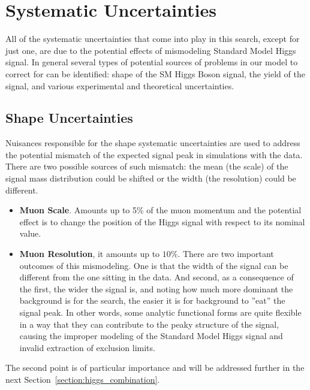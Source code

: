 \section{Systematic Uncertainties} \label{section:higgs_systematics}
All of the systematic uncertainties that come into play in this search, except for just one, are due to the potential effects of mismodeling Standard Model Higgs signal. In general several types of potential sources of problems in our model to correct for can be identified: shape of the SM Higgs Boson signal, the yield of the signal, and various experimental and theoretical uncertainties.

\subsection{Shape Uncertainties}
Nuisances responsible for the shape systematic uncertainties are used to address the potential mismatch of the expected signal peak in simulations with the data. There are two possible sources of such mismatch: the mean (the scale) of the signal mass distribution could be shifted or the width (the resolution) could be different.
\begin{itemize}
    \item {\bf Muon Scale}. Amounts up to 5\% of the muon momentum and the potential effect is to change the position of the Higgs signal with respect to its nominal value.
    \item {\bf Muon Resolution}, it amounts up to $10\%$. There are two important outcomes of this mismodeling. One is that the width of the signal can be different from the one sitting in the data. And second, as a consequence of the first, the wider the signal is, and noting how much more dominant the background is for the search, the easier it is for background to ''eat'' the signal peak. In other words, some analytic functional forms are quite flexible in a way that they can contribute to the peaky structure of the signal, causing the improper modeling of the Standard Model Higgs signal and invalid extraction of exclusion limits.
\end{itemize}
The second point is of particular importance and will be addressed further in the next Section~\ref{section:higgs_combination}.

